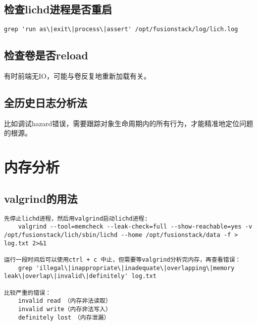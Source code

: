 \subsection{检查lichd进程是否重启}


\begin{lstlisting}
grep 'run as\|exit\|process\|assert' /opt/fusionstack/log/lich.log
\end{lstlisting}

\subsection{检查卷是否reload}

有时前端无IO，可能与卷反复地重新加载有关。

\subsection{全历史日志分析法}

比如调试hazard错误，需要跟踪对象生命周期内的所有行为，才能精准地定位问题的根源。

\section{内存分析}

\subsection{valgrind的用法}

\begin{lstlisting}
先停止lichd进程，然后用valgrind启动lichd进程:
    valgrind --tool=memcheck --leak-check=full --show-reachable=yes -v /opt/fusionstack/lich/sbin/lichd --home /opt/fusionstack/data -f > log.txt 2>&1

运行一段时间后可以使用ctrl + c 中止，但需要等valgrind分析完内存，再查看错误：
    grep 'illegal\|inappropriate\|inadequate\|overlapping\|memory leak\|overlap\|invalid\|definitely' log.txt

比较严重的错误：　　　
    invalid read （内存非法读取）
    invalid write（内存非法写入）
    definitely lost　（内存泄漏）
\end{lstlisting}

